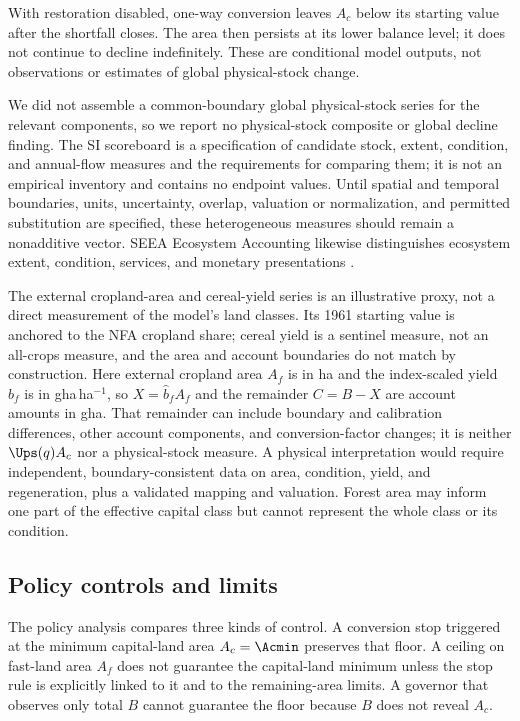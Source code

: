 With restoration disabled, one-way conversion leaves $A_c$ below its starting value after the shortfall closes. The area then persists at its lower balance level; it does not continue to decline indefinitely. These are conditional model outputs, not observations or estimates of global physical-stock change.

We did not assemble a common-boundary global physical-stock series for the relevant components, so we report no physical-stock composite or global decline finding. The SI scoreboard is a specification of candidate stock, extent, condition, and annual-flow measures and the requirements for comparing them; it is not an empirical inventory and contains no endpoint values. Until spatial and temporal boundaries, units, uncertainty, overlap, valuation or normalization, and permitted substitution are specified, these heterogeneous measures should remain a nonadditive vector. SEEA Ecosystem Accounting likewise distinguishes ecosystem extent, condition, services, and monetary presentations \citep{UN2021SEEA_EA}.

The external cropland-area and cereal-yield series is an illustrative proxy, not a direct measurement of the model's land classes. Its 1961 starting value is anchored to the NFA cropland share; cereal yield is a sentinel measure, not an all-crops measure, and the area and account boundaries do not match by construction. Here external cropland area $A_f$ is in ha and the index-scaled yield $\hat b_f$ is in gha\,ha$^{-1}$, so $X=\hat b_fA_f$ and the remainder $C=B-X$ are account amounts in gha. That remainder can include boundary and calibration differences, other account components, and conversion-factor changes; it is neither $\Ups(q)A_c$ nor a physical-stock measure. A physical interpretation would require independent, boundary-consistent data on area, condition, yield, and regeneration, plus a validated mapping and valuation. Forest area may inform one part of the effective capital class but cannot represent the whole class or its condition.

\subsection{Policy controls and limits}

The policy analysis compares three kinds of control. A conversion stop triggered at the minimum capital-land area $A_c=\Acmin$ preserves that floor. A ceiling on fast-land area $A_f$ does not guarantee the capital-land minimum unless the stop rule is explicitly linked to it and to the remaining-area limits. A governor that observes only total $B$ cannot guarantee the floor because $B$ does not reveal $A_c$.

